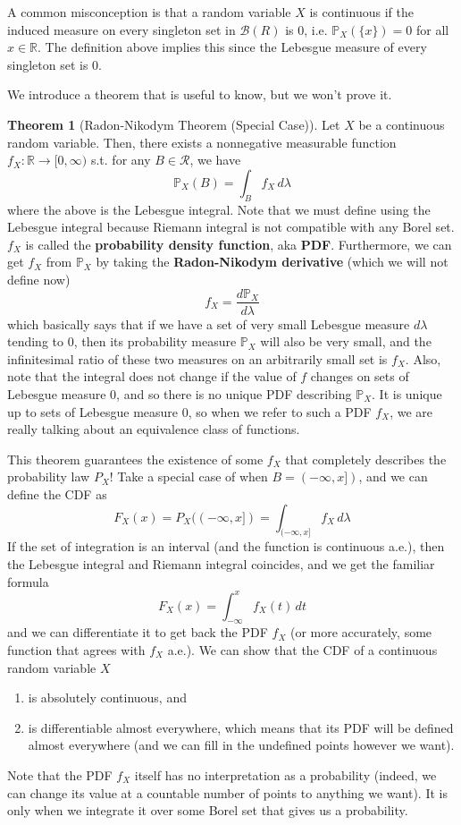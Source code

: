 \documentclass{article}
\theoremstyle{definition}
\newtheorem{theorem}{Theorem}[section]
\theoremstyle{remark}
\theoremstyle{definition}
\begin{document}
A common misconception is that a random variable $X$ is continuous if the induced measure on every singleton set in $\mathcal{B}(R)$ is $0$, i.e. $\mathbb{P}_X (\{x\}) = 0$ for all $x \in \mathbb{R}$. The definition above implies this since the Lebesgue measure of every singleton set is $0$. 

We introduce a theorem that is useful to know, but we won't prove it. 

\begin{theorem}[Radon-Nikodym Theorem (Special Case)]
Let $X$ be a continuous random variable. Then, there exists a nonnegative measurable function $f_X : \mathbb{R} \longrightarrow [0, \infty)$ s.t. for any $B \in \mathcal{R}$, we have 
\[\mathbb{P}_X (B) = \int_B f_X \, d\lambda\]
where the above is the Lebesgue integral. Note that we must define using the Lebesgue integral because Riemann integral is not compatible with any Borel set. $f_X$ is called the \textbf{probability density function}, aka \textbf{PDF}. Furthermore, we can get $f_X$ from $\mathbb{P}_X$ by taking the \textbf{Radon-Nikodym derivative} (which we will not define now)
\[f_X = \frac{d \mathbb{P}_X}{d \lambda}\]
which basically says that if we have a set of very small Lebesgue measure $d \lambda$ tending to $0$, then its probability measure $\mathbb{P}_X$ will also be very small, and the infinitesimal ratio of these two measures on an arbitrarily small set is $f_X$. Also, note that the integral does not change if the value of $f$ changes on sets of Lebesgue measure $0$, and so there is no unique PDF describing $\mathbb{P}_X$. It is unique up to sets of Lebesgue measure $0$, so when we refer to such a PDF $f_X$, we are really talking about an equivalence class of functions. 
\end{theorem}

This theorem guarantees the existence of some $f_X$ that completely describes the probability law $P_X$! Take a special case of when $B = (-\infty, x])$, and we can define the CDF as 
\[F_X (x) = P_X ((-\infty, x]) = \int_{(-\infty, x]} f_X \, d\lambda\]
If the set of integration is an interval (and the function is continuous a.e.), then the Lebesgue integral and Riemann integral coincides, and we get the familiar formula 
\[F_X (x) = \int_{-\infty}^x f_X (t)\,dt\]
and we can differentiate it to get back the PDF $f_X$ (or more accurately, some function that agrees with $f_X$ a.e.). We can show that the CDF of a continuous random variable $X$
\begin{enumerate}
    \item is absolutely continuous, and 
    \item is differentiable almost everywhere, which means that its PDF will be defined almost everywhere (and we can fill in the undefined points however we want). 
\end{enumerate}
Note that the PDF $f_X$ itself has no interpretation as a probability (indeed, we can change its value at a countable number of points to anything we want). It is only when we integrate it over some Borel set that gives us a probability. 
\end{document}
